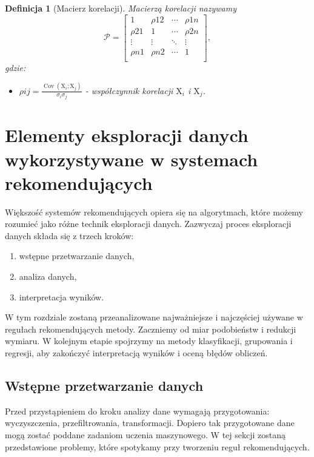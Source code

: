 \documentclass[12pt,a4paper]{report}
\newtheorem{df}{Definicja}[chapter]
\newcommand{\Covariance}[2]{\operatorname{Cov}\left({#1}; {#2} \right)}
\begin{document}
\begin{df}[Macierz korelacji]
Macierzą korelacji nazywamy
$$
\mathcal{P}= \left[
        \begin{array}{cccc}
         1 & \rho{12} & \cdots & \rho{1n} \\
         \rho{21} & 1 & \cdots & \rho{2n} \\
         \vdots & \vdots & \ddots & \vdots \\ 
         \rho{n1} & \rho{n2} & \cdots & 1 \\ 
         \end{array}
      \right], 
$$
gdzie:
\begin{itemize}
\item $\rho{ij}=\frac{\Covariance{\mathrm{X}_i}{\mathrm{X}_j}}{\sigma_{i}\sigma_{j}}$ - współczynnik korelacji $\mathrm{X}_i$ i $\mathrm{X}_j$.
\end{itemize}
\end{df}

\chapter{Elementy eksploracji danych wykorzystywane w systemach rekomendujących}
Większość systemów rekomendujących opiera się na algorytmach, które możemy rozumieć jako różne technik eksploracji danych. 
Zazwyczaj proces eksploracji danych składa się z trzech kroków:
\begin{enumerate}
\item wstępne przetwarzanie danych,
\item analiza danych,
\item interpretacja wyników.
\end{enumerate}
W tym rozdziale zostaną przeanalizowane najważniejsze i najczęściej używane w regułach rekomendujących metody. Zaczniemy od miar podobieństw i redukcji wymiaru. W kolejnym etapie spojrzymy na metody klasyfikacji, grupowania i regresji, aby zakończyć interpretacją wyników i oceną błędów obliczeń.

\section{Wstępne przetwarzanie danych}
Przed przystąpieniem do kroku analizy dane wymagają przygotowania: wyczyszczenia, przefiltrowania, transformacji. Dopiero tak przygotowane dane mogą zostać poddane zadaniom uczenia maszynowego. W tej sekcji zostaną przedstawione problemy, które spotykamy przy tworzeniu reguł rekomendujących.
\end{document}
